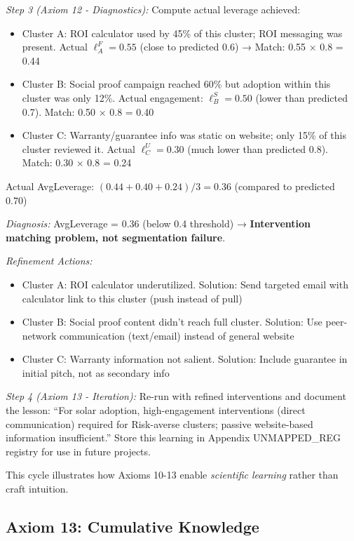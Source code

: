 \textit{Step 3 (Axiom 12 - Diagnostics):} Compute actual leverage achieved:
\begin{itemize}[nosep]
\item Cluster A: ROI calculator used by 45\% of this cluster; ROI messaging was present. Actual $\ell_A^{F} = 0.55$ (close to predicted 0.6) → Match: 0.55 × 0.8 = 0.44
\item Cluster B: Social proof campaign reached 60\% but adoption within this cluster was only 12\%. Actual engagement: $\ell_B^{S} = 0.50$ (lower than predicted 0.7). Match: 0.50 × 0.8 = 0.40
\item Cluster C: Warranty/guarantee info was static on website; only 15\% of this cluster reviewed it. Actual $\ell_C^{U} = 0.30$ (much lower than predicted 0.8). Match: 0.30 × 0.8 = 0.24
\end{itemize}

Actual AvgLeverage: $(0.44 + 0.40 + 0.24) / 3 = 0.36$ (compared to predicted 0.70)

\textit{Diagnosis:} AvgLeverage = 0.36 (below 0.4 threshold) → \textbf{Intervention matching problem, not segmentation failure}.

\textit{Refinement Actions:}
\begin{itemize}[nosep]
\item Cluster A: ROI calculator underutilized. Solution: Send targeted email with calculator link to this cluster (push instead of pull)
\item Cluster B: Social proof content didn't reach full cluster. Solution: Use peer-network communication (text/email) instead of general website
\item Cluster C: Warranty information not salient. Solution: Include guarantee in initial pitch, not as secondary info
\end{itemize}

\textit{Step 4 (Axiom 13 - Iteration):} Re-run with refined interventions and document the lesson: ``For solar adoption, high-engagement interventions (direct communication) required for Risk-averse clusters; passive website-based information insufficient.'' Store this learning in Appendix UNMAPPED_REG registry for use in future projects.

This cycle illustrates how Axioms 10-13 enable \emph{scientific learning} rather than craft intuition.

\subsection{Axiom 13: Cumulative Knowledge}

